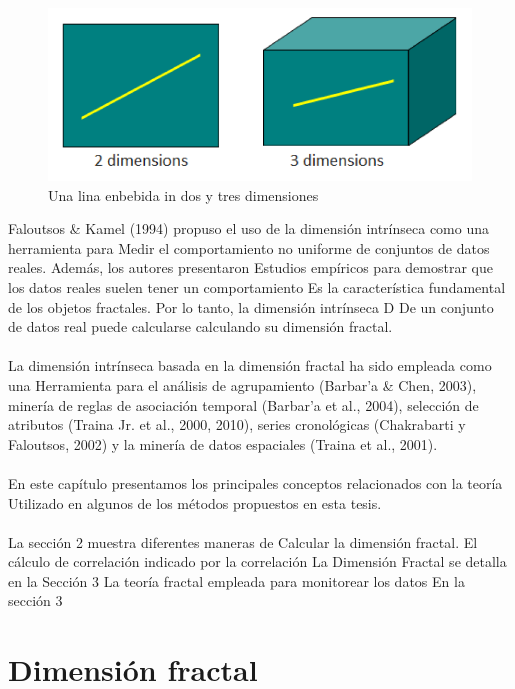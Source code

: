 \begin{figure}[h]
\centering
\includegraphics[scale=1.2]{chapter4/ima3.png}
\caption{Una lina enbebida in dos y tres dimensiones}
\label{fig:ima3}
\end{figure}


Faloutsos & Kamel (1994) propuso el uso de la dimensión intrínseca como una herramienta para
Medir el comportamiento no uniforme de conjuntos de datos reales. Además, los autores presentaron
Estudios empíricos para demostrar que los datos reales suelen tener un comportamiento
Es la característica fundamental de los objetos fractales. Por lo tanto, la dimensión intrínseca D
De un conjunto de datos real puede calcularse calculando su dimensión fractal.
\\\\
La dimensión intrínseca basada en la dimensión fractal ha sido empleada como una Herramienta para el análisis de agrupamiento (Barbar'a & Chen, 2003), minería de reglas de asociación temporal
(Barbar'a et al., 2004), selección de atributos (Traina Jr. et al., 2000, 2010), series cronológicas
(Chakrabarti y Faloutsos, 2002) y la minería de datos espaciales (Traina et al., 2001).
\\\\
En este capítulo presentamos los principales conceptos relacionados con la teoría
Utilizado en algunos de los métodos propuestos en esta tesis.
\\\\
La sección 2 muestra diferentes maneras de
Calcular la dimensión fractal. El cálculo de correlación indicado por la correlación
La Dimensión Fractal se detalla en la Sección 3 La teoría fractal empleada para monitorear los datos En la sección 3

\section{Dimensión fractal}

